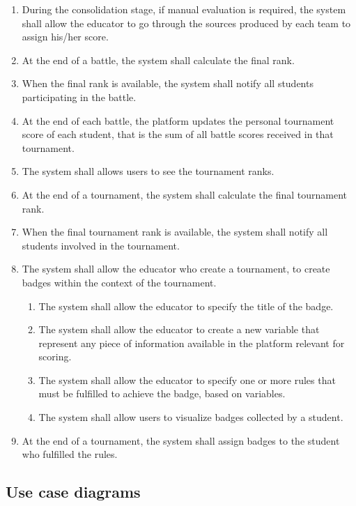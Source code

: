 \begin{enumerate}[label=\textbf{R\arabic*}:,leftmargin=1.3cm]
    \item During the consolidation stage, if manual evaluation is required, the system shall allow the educator to go through the sources produced by each team to assign his/her score.
    \item At the end of a battle, the system shall calculate the final rank.
    \item When the final rank is available, the system shall notify all students participating in the battle.
    \item At the end of each battle, the platform updates the personal tournament score of each student, that is the sum of all battle scores received in that tournament.
    \item The system shall allows users to see the tournament ranks.
    \item At the end of a tournament, the system shall calculate the final tournament rank.
    \item When the final tournament rank is available, the system shall notify all students involved in the tournament.
    \item The system shall allow the educator who create a tournament, to create badges within the context of the tournament.
    \begin{enumerate}[label=\textbf{R\arabic{enumi}.\arabic*}:, leftmargin=*]
        \item The system shall allow the educator to specify the title of the badge.
        \item The system shall allow the educator to create a new variable that represent any piece of information available in the platform relevant for scoring.
        \item The system shall allow the educator to specify one or more rules that must be fulfilled to achieve the badge, based on variables.
        \item The system shall allow users to visualize badges collected by a student.
    \end{enumerate}
    \item At the end of a tournament, the system shall assign badges to the student who fulfilled the rules.
\end{enumerate}
\subsection{Use case diagrams}

